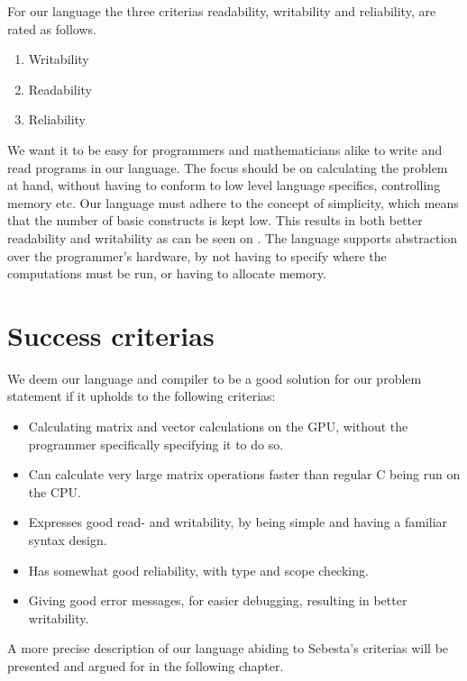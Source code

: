 For our language the three criterias readability, writability and reliability, are rated as follows.

\begin{enumerate}
	\item Writability
	\item Readability
	\item Reliability
\end{enumerate}

We want it to be easy for programmers and mathematicians alike to write and read programs in our language.
The focus should be on calculating the problem at hand, without having to conform to low level language specifics, controlling memory etc.
Our language must adhere to the concept of simplicity, which means that the number of basic constructs is kept low. 
This results in both better readability and writability as can be seen on .
The language supports abstraction over the programmer's hardware, by not having to specify where the computations must be run, or having to allocate memory.

\section{Success criterias}\label{sec:OurCriterias}
We deem our language and compiler to be a good solution for our problem statement if it upholds to the following criterias:

\begin{itemize}
	\item Calculating matrix and vector calculations on the GPU, without the programmer specifically specifying it to do so.
	\item Can calculate very large matrix operations faster than regular C being run on the CPU.
	\item Expresses good read- and writability, by being simple and having a familiar syntax design.
	\item Has somewhat good reliability, with type and scope checking.
	\item Giving good error messages, for easier debugging, resulting in better writability.
\end{itemize}

A more precise description of our language abiding to Sebesta's criterias will be presented and argued for in the following chapter.
